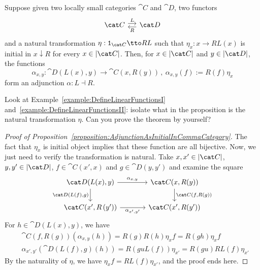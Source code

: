 \begin{proposition}\label{proposition:AdjunctionAsInitialInCommaCategory}
Suppose given two locally small categories \(\cat C\) and \(\cat D\), two functors
\[\begin{tikzcd}[column sep=small]
\cat C \ar["L", r, shift left] & \cat D \ar["R", l, shift left]
\end{tikzcd}\]
and a natural transformation \(\eta : \id_{\cat C} \tto RL\) such that \(\eta_x : x \to RL(x)\) is initial in \(x {\downarrow} R\)  for every \(x \in \obj{\cat C}\).  Then, for \(x \in \obj{\cat C}\) and \(y \in \obj{\cat D}\), the functions
\[\alpha_{x,y} : \cat D(L(x), y) \to \cat C(x, R(y)) \,,\ \alpha_{x,y}(f) := R(f)\eta_x\]
form an adjunction \(\alpha : L \dashv R\).
\end{proposition}

\begin{exercise}
Look at Example~\ref{example:DefineLinearFunctionsI} and~\ref{example:DefineLinearFunctionsII}: isolate what in the proposition is the natural transformation \(\eta\). Can you prove the theorem by yourself?
\end{exercise}

\begin{proof}[Proof of Proposition~\ref{proposition:AdjunctionAsInitialInCommaCategory}]
The fact that \(\eta_x\) is initial object implies that these function are all bijective. Now, we just need to verify the transformation is natural. Take \(x, x' \in \obj{\cat C}\), \(y, y' \in \obj{\cat D}\), \(f \in \cat C(x', x)\) and \(g \in \cat D(y, y')\) and examine the square
\[\begin{tikzcd}[column sep=large]
\cat D(L(x), y) \ar["{\cat D(L(f), g)}", d, swap] \ar["{\alpha_{x,y}}", r] & \cat C(x, R(y)) \ar["{\cat C(f, R(g))}", d] \\
\cat C(x', R\left(y'\right)) \ar["{\alpha_{x',y'}}", r, swap] & \cat C(x', R(y'))
\end{tikzcd}\]
For \(h \in \cat D(L(x), y)\), we have
\begin{align*}
& \cat C(f, R(g)) (\alpha_{x,y} (h)) = R(g) R(h) \eta_x f = R(gh) \eta_x f \\
& \alpha_{x',y'} (\cat D (L(f), g)(h)) = R(guL(f)) \eta_{x'} = R(gu) RL(f) \eta_{x'}
\end{align*}
By the naturality of \(\eta\), we have \(\eta_x f = RL(f) \eta_{x'}\), and the proof ends here.
\end{proof}

